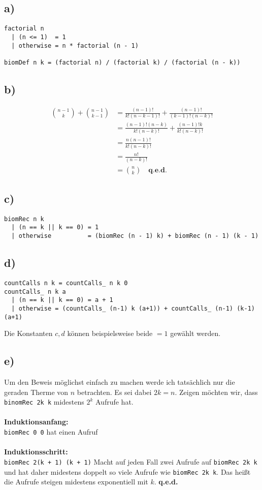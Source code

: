 \documentclass[a4paper, parskip=half]{scrartcl}
\begin{document}
  \subsection*{a)}
\begin{verbatim}
factorial n 
  | (n <= 1)  = 1
  | otherwise = n * factorial (n - 1)  

biomDef n k = (factorial n) / (factorial k) / (factorial (n - k))
\end{verbatim}
  \subsection*{b)}
  \begin{align}
    \binom{n - 1}{k} + \binom{n - 1}{k - 1} &= \frac{(n - 1)!}{k!(n - k - 1)!} + \frac{(n-1)!}{(k-1)!(n-k)!} \\
    &= \frac{(n-1)!(n-k)}{k!(n-k)!} + \frac{(n-1)!k}{k!(n-k)!} \\
    &= \frac{n(n-1)!}{k!(n-k)!} \\
    &= \frac{n!}{(n-k)!} \\
    &= \binom{n}{k} \quad \textbf{q.e.d.}
  \end{align}
  \subsection*{c)}
\begin{verbatim}
biomRec n k 
  | (n == k || k == 0) = 1
  | otherwise          = (biomRec (n - 1) k) + biomRec (n - 1) (k - 1)    
\end{verbatim}
\subsection*{d)}
\begin{verbatim}
countCalls n k = countCalls_ n k 0
countCalls_ n k a
  | (n == k || k == 0) = a + 1
  | otherwise = (countCalls_ (n-1) k (a+1)) + countCalls_ (n-1) (k-1) (a+1) 
\end{verbatim}
Die Konstanten $c, d$ können beispielsweise beide $= 1$ gewählt werden. 
\subsection*{e)}
Um den Beweis möglichst einfach zu machen werde ich tatsächlich nur die geraden Therme von $n$ betrachten. Es sei dabei $2k= n$. Zeigen möchten wir, dass \verb+binomRec 2k k+ midestens $2^k$ Aufrufe hat.\\ \\
\textbf{Induktionsanfang:} \\
\verb+biomRec 0 0+ hat einen Aufruf \\\\
\textbf{Induktionsschritt:}\\
\verb§biomRec 2(k + 1) (k + 1)§ Macht auf jeden Fall zwei Aufrufe auf \verb§biomRec 2k k§ und hat daher midestens doppelt so viele Aufrufe wie  \verb§biomRec 2k k§. Das heißt die Aufrufe steigen midestens exponentiell mit $k$. \textbf{q.e.d.}\ \\ \\
\end{document}
